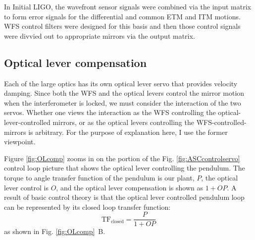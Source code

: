 In Initial LIGO, the wavefront sensor signals were combined via the input matrix to form error signals for the differential and common ETM and ITM motions.
WFS control filters were designed for this basis and then those control signals were divvied out to appropriate mirrors via the output matrix. 



\subsection{Optical lever compensation}
\label{sec:oplevcomp}
Each of the large optics has its own optical lever servo that provides velocity damping. Since both the WFS and the optical levers control the mirror motion when the interferometer is locked, we must consider the interaction of the two servos. Whether one views the interaction as the WFS controlling the optical-lever-controlled mirrors, or as the optical levers controlling the WFS-controlled-mirrors is arbitrary. For the purpose of explanation here, I use the former viewpoint.

Figure \ref{fig:OLcomp} zooms in on the portion of the Fig. \ref{fig:ASCcontrolservo} control loop picture that shows the optical lever controlling the pendulum. The torque to angle transfer function of the pendulum is our plant, $P$, the optical lever control is $O$, and the optical lever compensation is shown as $1+OP$. A result of basic control theory is that the optical lever controlled pendulum loop can be represented by its closed loop transfer function:
\begin{equation}
\mathrm{TF_{closed}} = \frac{P}{1+OP}
\end{equation}
as shown in Fig. \ref{fig:OLcomp}~B. 


